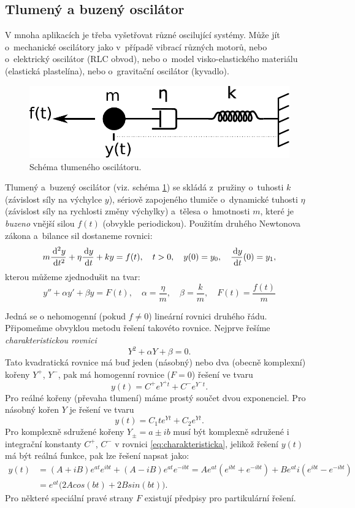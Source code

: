 \documentclass[a4paper, 12pt]{book}
\theoremstyle{definition}
\def\d{\,{\rm d}}               %
\def\df#1{\emph{#1}}
\begin{document}
\subsection{Tlumený a buzený oscilátor}
\label{sec::oscilator}
V mnoha aplikacích je třeba vyšetřovat různé oscilující systémy. Může jít o~mechanické oscilátory jako v~případě 
vibrací různých motorů, nebo o~elektrický oscilátor (RLC obvod), nebo o~model visko-elastického materiálu (elastická plastelína), nebo o~gravitační oscilátor (kyvadlo).
\begin{figure}[h]
\label{fig:oscilator}
\begin{center}
\includegraphics[scale=0.4]{maxwell_diagram.pdf}
\caption{Schéma tlumeného oscilátoru.}
\end{center}
\end{figure}
Tlumený a~buzený oscilátor (viz. schéma \ref{fig:oscilator}) se skládá z~pružiny o~tuhosti $k$ (závislost síly na výchylce $y$),
sériově zapojeného tlumiče o~dynamické tuhosti $\eta$ (závislost síly na rychlosti změny výchylky) a~tělesa o~hmotnosti $m$, které je \emph{buzeno} vnější silou $f(t)$
(obvykle periodickou). 
Použitím druhého Newtonova zákona a~bilance sil dostaneme rovnici:
\[
 m\frac{\d^2y}{\d t^2}+\eta \frac{\d y}{\d t}+ky=f(t),\quad t>0,\quad y(0)=y_0,\quad \frac{\d y}{\d t}(0) = y_1,
\]
kterou můžeme zjednodušit na tvar:
\[
  y'' + \alpha y' + \beta y = F(t),\quad \alpha=\frac{\eta}{m},\quad  \beta=\frac{k}{m},\quad F(t)=\frac{f(t)}{m}
\]

Jedná se o nehomogenní (pokud $f\ne 0$) lineární rovnici druhého řádu. Při\-po\-meň\-me obvyklou metodu řešení takovéto rovnice.
Nejprve řešíme \df{charakteristickou rovnici}
\[
  Y^2 + \alpha Y + \beta =0.
\]
Tato kvadratická rovnice má buď jeden (násobný) nebo dva (obecně komplexní) kořeny $Y^+$, $Y^-$, pak má homogenní rovnice ($F=0$) řešení ve tvaru
\begin{equation}
   \label{eq:charakteristicka}
   y(t) = C^{+}e^{Y^{+} t} + C^{-}e^{Y^{-} t}.
\end{equation}
Pro reálné kořeny (převaha tlumení) máme prostý součet dvou exponenciel. Pro násobný kořen $Y$ je řešení ve tvaru
\[
  y(t) = C_1 t e^{Yt} + C_2 e^{Yt}.
\]
Pro komplexně sdružené kořeny $Y_{\pm} = a \pm i b$ musí být komplexně sdružené i integrační konstanty $C^{+}$, $C^{-}$ v rovnici \eqref{eq:charakteristicka}, jelikož
řešení $y(t)$ má být reálná funkce, pak lze řešení napsat jako:
\begin{align*}
   y(t) &= (A + i B) e^{at} e^{ibt} + (A-iB)e^{at}e^{-ibt} = A e^{at} (e^{ibt} + e^{-ibt}) + B e^{at} i(e^{ibt} - e^{-ibt}) \\
   &= e^{at}\big( 2 A cos(bt) + 2 B sin(bt) \big).
\end{align*}
Pro některé speciální pravé strany $F$ existují předpisy pro partikulární řešení.
\end{document}

